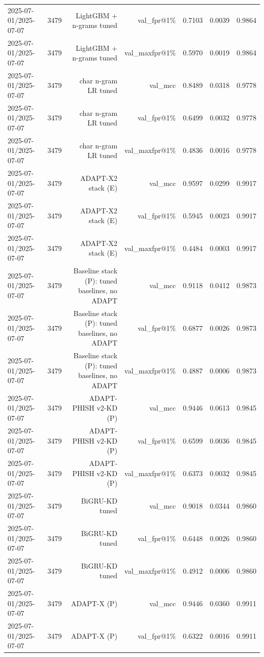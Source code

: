\begin{table}[t]
\begin{tabular}{llrrrrr}
2025-07-01/2025-07-07 & 3479 & LightGBM + n-grams tuned & val\_fpr@1\% & 0.7103 & 0.0039 & 0.9864 \\
2025-07-01/2025-07-07 & 3479 & LightGBM + n-grams tuned & val\_maxfpr@1\% & 0.5970 & 0.0019 & 0.9864 \\
2025-07-01/2025-07-07 & 3479 & char n-gram LR tuned & val\_mcc & 0.8489 & 0.0318 & 0.9778 \\
2025-07-01/2025-07-07 & 3479 & char n-gram LR tuned & val\_fpr@1\% & 0.6499 & 0.0032 & 0.9778 \\
2025-07-01/2025-07-07 & 3479 & char n-gram LR tuned & val\_maxfpr@1\% & 0.4836 & 0.0016 & 0.9778 \\
2025-07-01/2025-07-07 & 3479 & ADAPT-X2 stack (E) & val\_mcc & 0.9597 & 0.0299 & 0.9917 \\
2025-07-01/2025-07-07 & 3479 & ADAPT-X2 stack (E) & val\_fpr@1\% & 0.5945 & 0.0023 & 0.9917 \\
2025-07-01/2025-07-07 & 3479 & ADAPT-X2 stack (E) & val\_maxfpr@1\% & 0.4484 & 0.0003 & 0.9917 \\
2025-07-01/2025-07-07 & 3479 & Baseline stack (P): tuned baselines, no ADAPT & val\_mcc & 0.9118 & 0.0412 & 0.9873 \\
2025-07-01/2025-07-07 & 3479 & Baseline stack (P): tuned baselines, no ADAPT & val\_fpr@1\% & 0.6877 & 0.0026 & 0.9873 \\
2025-07-01/2025-07-07 & 3479 & Baseline stack (P): tuned baselines, no ADAPT & val\_maxfpr@1\% & 0.4887 & 0.0006 & 0.9873 \\
2025-07-01/2025-07-07 & 3479 & ADAPT-PHISH v2-KD (P) & val\_mcc & 0.9446 & 0.0613 & 0.9845 \\
2025-07-01/2025-07-07 & 3479 & ADAPT-PHISH v2-KD (P) & val\_fpr@1\% & 0.6599 & 0.0036 & 0.9845 \\
2025-07-01/2025-07-07 & 3479 & ADAPT-PHISH v2-KD (P) & val\_maxfpr@1\% & 0.6373 & 0.0032 & 0.9845 \\
2025-07-01/2025-07-07 & 3479 & BiGRU-KD tuned & val\_mcc & 0.9018 & 0.0344 & 0.9860 \\
2025-07-01/2025-07-07 & 3479 & BiGRU-KD tuned & val\_fpr@1\% & 0.6448 & 0.0026 & 0.9860 \\
2025-07-01/2025-07-07 & 3479 & BiGRU-KD tuned & val\_maxfpr@1\% & 0.4912 & 0.0006 & 0.9860 \\
2025-07-01/2025-07-07 & 3479 & ADAPT-X (P) & val\_mcc & 0.9446 & 0.0360 & 0.9911 \\
2025-07-01/2025-07-07 & 3479 & ADAPT-X (P) & val\_fpr@1\% & 0.6322 & 0.0016 & 0.9911 \\

\end{tabular}
\end{table}
